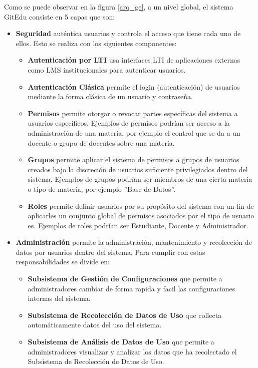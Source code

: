 Como se puede observar en la figura \ref{arq_ge}, a un nivel global, el sistema GitEdu consiste en 5 capas que son:
\begin{itemize}
	\item \textbf{Seguridad} auténtica usuarios y controla el acceso que tiene cada uno de ellos. Esto se realiza con los siguientes componentes:
    \begin{itemize}
    	\item \textbf{Autenticación por LTI} usa interfaces LTI de aplicaciones externas como LMS institucionales para autenticar usuarios.
		\item \textbf{Autenticación Clásica} permite el login (autenticación) de usuarios mediante la forma clásica de un usuario y contraseña.
		\item \textbf{Permisos} permite otorgar o revocar partes específicas del sistema a usuarios específicos. Ejemplos de permisos podrían ser acceso a la administración de una materia, por ejemplo el control que se da a un docente o grupo de docentes sobre una materia.
		\item \textbf{Grupos} permite aplicar el sistema de permisos a grupos de usuarios creados bajo la discreción de usuarios suficiente privilegiados dentro del sistema. Ejemplos de grupos podrían ser miembros de una cierta materia o tipo de materia, por ejemplo ''Base de Datos''.
		\item \textbf{Roles} permite definir usuarios por su propósito del sistema con un fin de aplicarles un conjunto global de permisos asociados por el tipo de usuario es. Ejemplos de roles podrían ser Estudiante, Docente y Administrador.
    \end{itemize}
    \item \textbf{Administración} permite la administración, mantenimiento y recolección de datos por usuarios dentro del sistema. Para cumplir con estas responsabilidades se divide en:
    \begin{itemize}
    	\item \textbf{Subsistema de Gestión de Configuraciones} que permite a administradores cambiar de forma rapida y facil las configuraciones internas del sistema.
        \item \textbf{Subsistema de Recolección de Datos de Uso} que collecta automáticamente datos del uso del sistema.
        \item \textbf{Subsistema de Análisis de Datos de Uso} que permite a administradores visualizar y analizar los datos que ha recolectado el Subsistema de Recolección de Datos de Uso.

\end{itemize}
\end{itemize}
